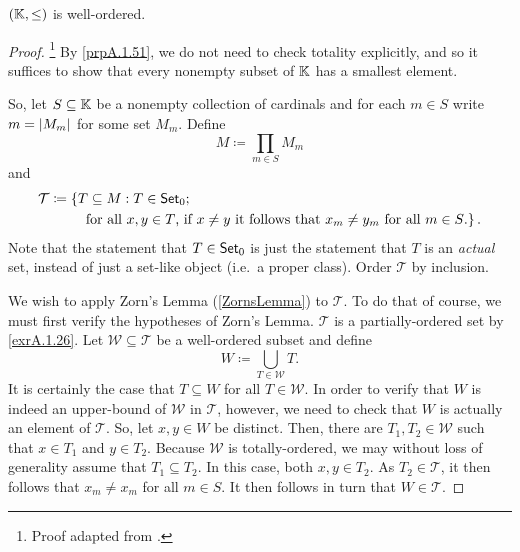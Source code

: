 \begin{thm}\label{thm1.1.34}
$(\mathbb{K} ,\leq )$ is well-ordered.
\begin{proof}\footnote{Proof adapted from \cite{Honig}.}
By \cref{prpA.1.51}, we do not need to check totality explicitly, and so it suffices to show that every nonempty subset of $\mathbb{K}$ has a smallest element.

So, let $S\subseteq \mathbb{K}$ be a nonempty collection of cardinals and for each $m\in S$ write $m=\lvert M_m\rvert$ for some set $M_m$.  Define
\begin{equation}
M\coloneqq \prod _{m\in S}M_m
\end{equation}
and
\begin{equation}\label{1.1.39}
\begin{split}
\mathcal{T} & \coloneqq \left\{ T\subseteq M:T\in \mathsf{Set} _0;\right. \\
& \qquad \left.  \text{ for all }x,y\in T\text{, if }x\neq y\text{ it follows that }x_m\neq y_m\text{ for all }m\in S\text{.}\right\} .
\end{split}
\end{equation}
Note that the statement that $T\in \mathsf{Set} _0$ is just the statement that $T$ is an \emph{actual} set, instead of just a set-like object (i.e.~a proper class).  Order $\mathcal{T}$ by inclusion.

We wish to apply Zorn's Lemma (\cref{ZornsLemma}) to $\mathcal{T}$.  To do that of course, we must first verify the hypotheses of Zorn's Lemma.  $\mathcal{T}$ is a partially-ordered set by \cref{exrA.1.26}.  Let $\mathcal{W}\subseteq \mathcal{T}$ be a well-ordered subset and define
\begin{equation}
W\coloneqq \bigcup _{T\in \mathcal{W}}T.
\end{equation}
It is certainly the case that $T\subseteq W$ for all $T\in \mathcal{W}$.  In order to verify that $W$ is indeed an upper-bound of $\mathcal{W}$ in $\mathcal{T}$, however, we need to check that $W$ is actually an element of $\mathcal{T}$.  So, let $x,y\in W$ be distinct.  Then, there are $T_1,T_2\in \mathcal{W}$ such that $x\in T_1$ and $y\in T_2$.  Because $\mathcal{W}$ is totally-ordered, we may without loss of generality assume that $T_1\subseteq T_2$.  In this case, both $x,y\in T_2$.  As $T_2\in \mathcal{T}$, it then follows that $x_m\neq x_m$ for all $m\in S$.  It then follows in turn that $W\in \mathcal{T}$.


\end{proof}
\end{thm}
